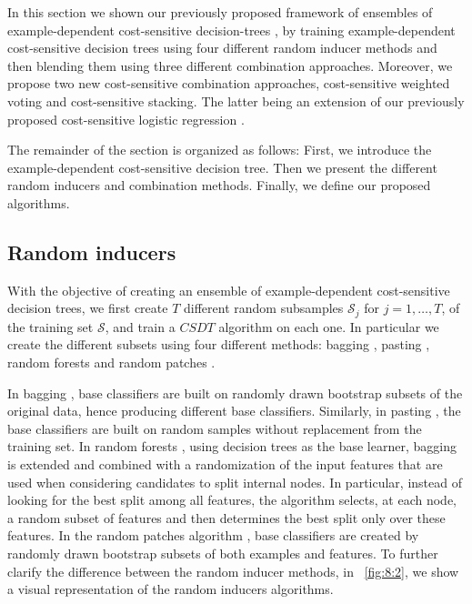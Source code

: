 {In this section we shown our previously proposed framework of ensembles of  example-dependent 
cost-sensitive  decision-trees \citep{CorreaBahnsen2015b}, by training example-dependent 
cost-sensitive decision trees using four different  random inducer methods and then blending them 
using three different combination approaches. Moreover, we propose two new cost-sensitive 
combination approaches, cost-sensitive weighted  voting and cost-sensitive stacking. The latter 
being an extension of our previously proposed cost-sensitive logistic regression 
\citep{CorreaBahnsen2014b}. 

The remainder of the section is organized as follows: First, we introduce the example-dependent 
cost-sensitive decision tree. Then we present the different random inducers and combination 
methods. Finally, we define our proposed algorithms.


\subsection{Random inducers}

With the objective of creating an ensemble of example-dependent cost-sensitive decision trees, we 
first create $T$ different random subsamples $\mathcal{S}_j$ for $j=1,\dots,T$, of the training  set 
$\mathcal{S}$, and train a $CSDT$ algorithm on each one. In particular we create the different 
subsets using four different methods: bagging \citep{Breiman1996}, pasting \citep{Breiman1999}, 
random forests \citep{Breiman2001} and random patches \citep{Louppe2012}. 

In bagging \citep{Breiman1996}, base classifiers are built on randomly drawn bootstrap subsets of 
the original data, hence producing different base classifiers. Similarly, in pasting 
\citep{Breiman1999}, the base classifiers are built on random  samples without replacement from 
the training set. In random forests \citep{Breiman2001}, using decision trees as the base learner, 
bagging   is extended and   combined  with a  randomization of the input features that  are used 
when  considering candidates  to split    internal nodes. In particular, instead of looking for  
the best  split among all   features, the   algorithm selects, at each node, a random subset of 
features  and then determines   the best split only over  these features. In the random patches   
algorithm \citep{Louppe2012}, base classifiers are created by randomly     drawn bootstrap subsets 
of both examples and features. To further clarify the difference between the random inducer 
methods, in \figurename{~\ref{fig:8:2}}, we show a visual representation of the random inducers 
algorithms.
 
}
